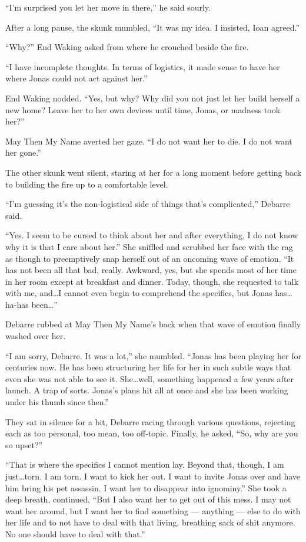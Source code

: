 ``I'm surprised you let her move in there,'' he said sourly.

After a long pause, the skunk mumbled, ``It was my idea. I insisted, Ioan agreed.''

``Why?'' End Waking asked from where he crouched beside the fire.

``I have incomplete thoughts. In terms of logistics, it made sense to have her where Jonas could not act against her.''

End Waking nodded. ``Yes, but why? Why did you not just let her build herself a new home? Leave her to her own devices until time, Jonas, or madness took her?''

May Then My Name averted her gaze. ``I do not want her to die. I do not want her gone.''

The other skunk went silent, staring at her for a long moment before getting back to building the fire up to a comfortable level.

``I'm guessing it's the non-logistical side of things that's complicated,'' Debarre said.

``Yes. I seem to be cursed to think about her and after everything, I do not know why it is that I care about her.'' She sniffled and scrubbed her face with the rag as though to preemptively snap herself out of an oncoming wave of emotion. ``It has not been all that bad, really. Awkward, yes, but she spends most of her time in her room except at breakfast and dinner. Today, though, she requested to talk with me, and\ldots I cannot even begin to comprehend the specifics, but Jonas has\ldots ha-has been\ldots{}''

Debarre rubbed at May Then My Name's back when that wave of emotion finally washed over her.

``I am sorry, Debarre. It was a lot,'' she mumbled. ``Jonas has been playing her for centuries now. He has been structuring her life for her in such subtle ways that even she was not able to see it. She\ldots well, something happened a few years after launch. A trap of sorts. Jonas's plans hit all at once and she has been working under his thumb since then.''

They sat in silence for a bit, Debarre racing through various questions, rejecting each as too personal, too mean, too off-topic. Finally, he asked, ``So, why are you so upset?''

``That is where the specifics I cannot mention lay. Beyond that, though, I am just\ldots torn. I am torn. I want to kick her out. I want to invite Jonas over and have him bring his pet assassin. I want her to disappear into ignominy.'' She took a deep breath, continued, ``But I also want her to get out of this mess. I may not want her around, but I want her to find something — anything — else to do with her life and to not have to deal with that living, breathing sack of shit anymore. No one should have to deal with that.''

